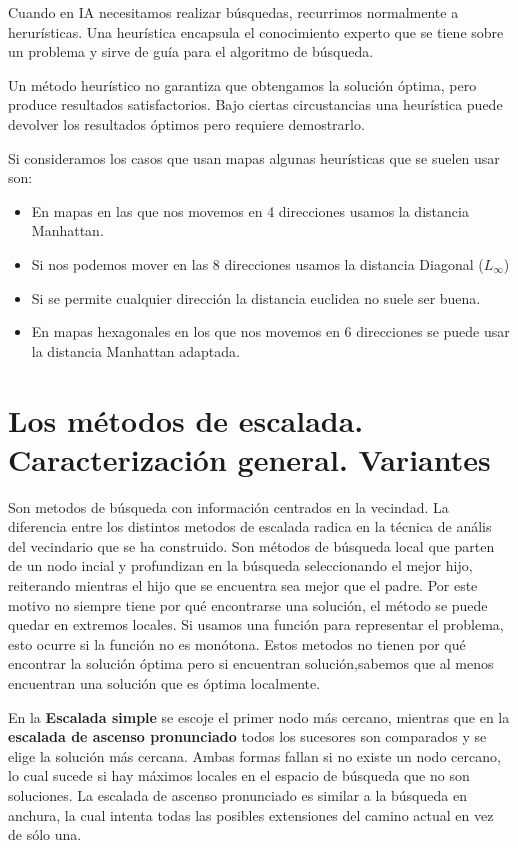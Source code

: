 \documentclass[12pt]{article}
\begin{document}
Cuando en IA necesitamos realizar búsquedas, recurrimos normalmente
a herurísticas. Una heurística encapsula el conocimiento experto que
se tiene sobre un problema y sirve de guía para el algoritmo de
búsqueda.

Un método heurístico no garantiza que obtengamos la solución óptima,
pero produce resultados satisfactorios. Bajo ciertas circustancias una
heurística puede devolver los resultados óptimos pero requiere
demostrarlo.

Si consideramos los casos que usan mapas algunas heurísticas que se
suelen usar son:

\begin{itemize}
\item En mapas en las que nos movemos en 4 direcciones usamos la
  distancia Manhattan.
\item Si nos podemos mover en las 8 direcciones usamos la distancia Diagonal ($L_\infty$)
\item Si se permite cualquier dirección la distancia euclidea no suele ser buena.
\item En mapas hexagonales en los que nos movemos en 6 direcciones se
  puede usar la distancia Manhattan adaptada.
\end{itemize}

\section{Los métodos de escalada. Caracterización general. Variantes}

Son metodos de búsqueda con información centrados en la vecindad. La
diferencia entre los distintos metodos de escalada radica en la
técnica de anális del vecindario que se ha construido. Son métodos de
búsqueda local que parten de un nodo incial y profundizan en la
búsqueda seleccionando el mejor hijo, reiterando mientras el hijo que
se encuentra sea mejor que el padre. Por este motivo no siempre tiene
por qué encontrarse una solución, el método se puede quedar en
extremos locales. Si usamos una función para representar el problema,
esto ocurre si la función no es monótona. Estos metodos no tienen por
qué encontrar la solución óptima pero si encuentran solución,sabemos
que al menos encuentran una solución que es óptima localmente.

En la \textbf{Escalada simple} se escoje el primer nodo más cercano,
mientras que en la \textbf{escalada de ascenso pronunciado} todos los
sucesores son comparados y se elige la solución más cercana. Ambas
formas fallan si no existe un nodo cercano, lo cual sucede si hay
máximos locales en el espacio de búsqueda que no son soluciones. La
escalada de ascenso pronunciado es similar a la búsqueda en anchura,
la cual intenta todas las posibles extensiones del camino actual en
vez de sólo una.
\end{document}
